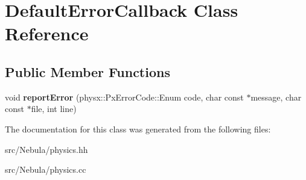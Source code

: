 \hypertarget{classDefaultErrorCallback}{\section{\-Default\-Error\-Callback \-Class \-Reference}
\label{classDefaultErrorCallback}
}
\subsection*{\-Public \-Member \-Functions}
\begin{DoxyCompactItemize}
\item 
\hypertarget{classDefaultErrorCallback_ae95118f6a45b47a1b72af9417f80d84e}{void {\bfseries report\-Error} (physx\-::\-Px\-Error\-Code\-::\-Enum code, char const $\ast$message, char const $\ast$file, int line)}\label{classDefaultErrorCallback_ae95118f6a45b47a1b72af9417f80d84e}

\end{DoxyCompactItemize}


\-The documentation for this class was generated from the following files\-:\begin{DoxyCompactItemize}
\item 
src/\-Nebula/physics.\-hh\item 
src/\-Nebula/physics.\-cc\end{DoxyCompactItemize}
